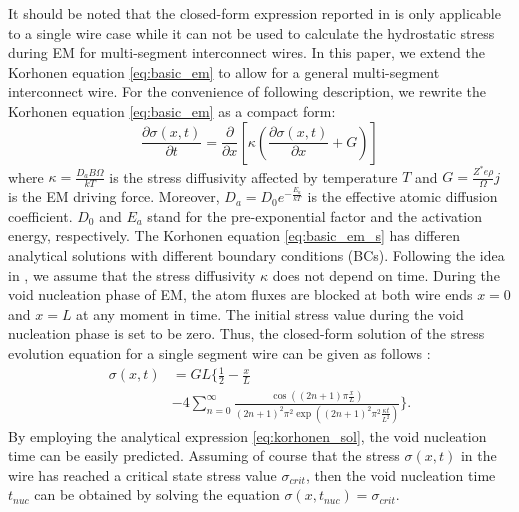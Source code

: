 It should be noted that the closed-form expression reported in \cite{Korhonen:jap1993} is only applicable to a single wire case while it can not be used to calculate the hydrostatic stress during EM for multi-segment interconnect wires. In this paper, we extend the Korhonen equation \eqref{eq:basic_em} to allow for a general multi-segment interconnect wire. For the convenience of following description, we rewrite the Korhonen equation \eqref{eq:basic_em} as a compact form:
\begin{equation}
\label{eq:basic_em_s}
\frac{\partial \sigma(x,t)}{\partial t}=\frac{\partial }{\partial x}\left[\kappa\left(\frac{\partial \sigma(x,t)}{\partial x}+G\right)\right]
\end{equation}
where $\kappa=\frac{D_aB\Omega}{kT}$ is the stress diffusivity affected by temperature $T$ and $G=\frac{Z^*e\rho}{\Omega}j$ is the EM driving force. Moreover, $D_a=D_0e^{-\frac{E_a}{kT}}$ is the effective atomic diffusion coefficient. $D_0$ and $E_a$ stand for the pre-exponential factor and the activation energy, respectively. The Korhonen equation \eqref{eq:basic_em_s} has differen analytical solutions with different boundary conditions (BCs). Following the idea in \cite{Korhonen:jap1993}, we assume that the stress diffusivity $\kappa$ does not depend on time. During the void nucleation phase of EM, the atom fluxes are blocked at both wire ends $x=0$ and $x=L$ at any moment in time. The initial stress value during the void nucleation phase is set to be zero. Thus, the closed-form solution of the stress evolution equation for a single segment wire can be given as follows \cite{Korhonen:jap1993}:
\begin{equation} \label{eq:korhonen_sol}
\begin{split}
\sigma(x,t)&= GL\{\frac{1}{2}-\frac{x}{L}\\
&-4\sum\limits_{n=0}^{\infty}\frac{\cos((2n+1)\pi
\frac{x}{L})}{(2n+1)^2\pi^2\exp((2n+1)^2\pi^2\frac{\kappa
t}{L^2})}\}.
\end{split}
\end{equation}
By employing the analytical expression \eqref{eq:korhonen_sol}, the void nucleation time can be easily predicted. Assuming of course that the stress $\sigma(x,t)$ in the wire has reached a critical state stress value $\sigma_{crit}$, then the void nucleation time $t_{nuc}$ can be obtained by solving the equation $\sigma(x,t_{nuc})=\sigma_{crit}$. 

